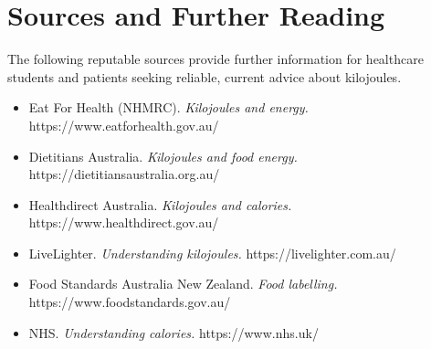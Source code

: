 \section*{Sources and Further Reading}
The following reputable sources provide further information for healthcare students and patients seeking reliable, current advice about kilojoules.
\begin{itemize}
    \item Eat For Health (NHMRC). \textit{Kilojoules and energy.} https://www.eatforhealth.gov.au/
    \item Dietitians Australia. \textit{Kilojoules and food energy.} https://dietitiansaustralia.org.au/
    \item Healthdirect Australia. \textit{Kilojoules and calories.} https://www.healthdirect.gov.au/
    \item LiveLighter. \textit{Understanding kilojoules.} https://livelighter.com.au/
    \item Food Standards Australia New Zealand. \textit{Food labelling.} https://www.foodstandards.gov.au/
    \item NHS. \textit{Understanding calories.} https://www.nhs.uk/
\end{itemize}

